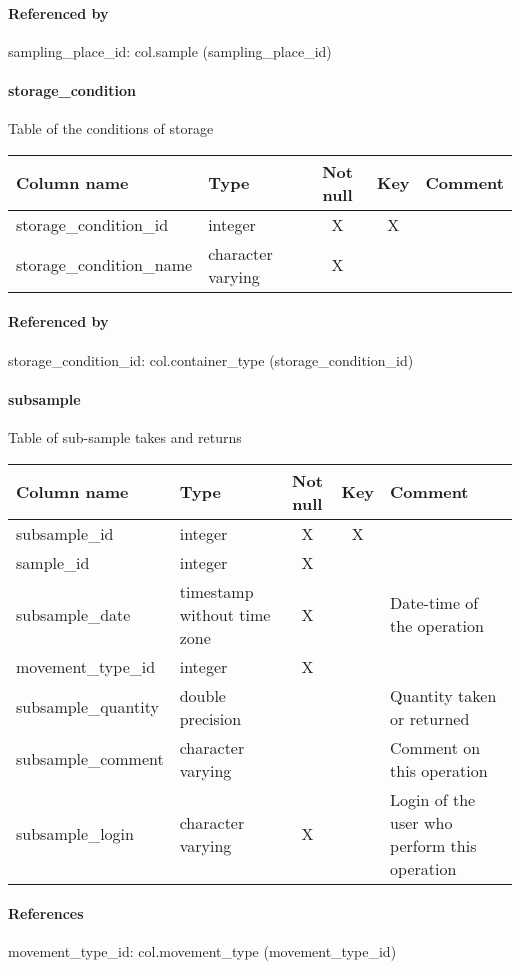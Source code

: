 \paragraph{Referenced by}
sampling\_place\_id: col.sample (sampling\_place\_id)

\paragraph{storage\_condition}
Table of the conditions of storage

\begin{tabular}{|l| p{2cm}|c|c| p{5cm}|}
\hline
Column name & Type & Not null & Key & Comment \\
\hline
storage\_condition\_id & integer & X & X & \\
storage\_condition\_name & character varying & X &  & \\
\hline
\end{tabular}
\paragraph{Referenced by}
storage\_condition\_id: col.container\_type (storage\_condition\_id)

\paragraph{subsample}
Table of sub-sample takes and returns

\begin{tabular}{|l| p{2cm}|c|c| p{5cm}|}
\hline
Column name & Type & Not null & Key & Comment \\
\hline
subsample\_id & integer & X & X & \\
sample\_id & integer & X &  & \\
subsample\_date & timestamp without time zone & X &  & Date-time of the operation\\
movement\_type\_id & integer & X &  & \\
subsample\_quantity & double precision &  &  & Quantity taken or returned\\
subsample\_comment & character varying &  &  & Comment on this operation\\
subsample\_login & character varying & X &  & Login of the user who perform this operation\\
\hline
\end{tabular}
\paragraph{References}
movement\_type\_id: col.movement\_type (movement\_type\_id)

